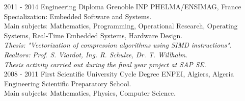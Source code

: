 \documentclass[]{friggeri-cv}
\begin{document}
\begin{entrylist}
  \entry
    {2011 - 2014}
    {Engineering Diploma}
    {Grenoble INP PHELMA/ENSIMAG, France}
    {Specialization: Embedded Software and Systems.\\
    Main subjects: Mathematics, Programming, Operational Research, Operating Systems, Real-Time Embedded Systems, Hardware Design.\\
    \emph{Thesis: "Vectorization of compression algorithms using SIMD instructions".}\\
    \emph{Realtors: Prof. S. Viardot, Ing. R. Schulze, Dr. T. Willhalm.}\\
    \emph{Thesis activity carried out during the final year project at SAP SE.}\\}
    \vspace*{-3mm}
  \entry
    {2008 - 2011}
    {First Scientific University Cycle Degree}
    {ENPEI, Algiers, Algeria}
    {Engineering Scientific Preparatory School.\\
    Main subjects: Mathematics, Physics, Computer Science.}
\end{entrylist}
\end{document}
